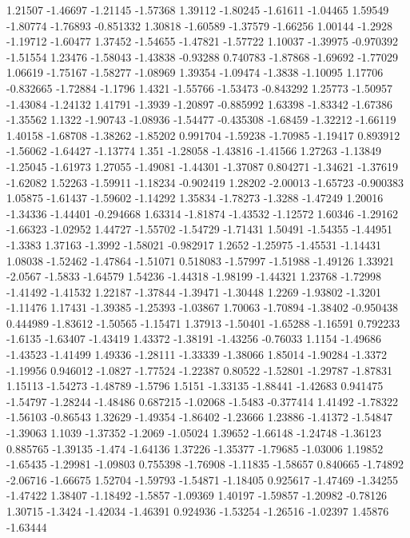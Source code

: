 \documentclass[9pt]{article}
\theoremstyle{plain}
\theoremstyle{definition}
\theoremstyle{remark}
\numberwithin{equation}{section}
\begin{document}
1.21507
-1.46697
-1.21145
-1.57368
1.39112
-1.80245
-1.61611
-1.04465
1.59549
-1.80774
-1.76893
-0.851332
1.30818
-1.60589
-1.37579
-1.66256
1.00144
-1.2928
-1.19712
-1.60477
1.37452
-1.54655
-1.47821
-1.57722
1.10037
-1.39975
-0.970392
-1.51554
1.23476
-1.58043
-1.43838
-0.93288
0.740783
-1.87868
-1.69692
-1.77029
1.06619
-1.75167
-1.58277
-1.08969
1.39354
-1.09474
-1.3838
-1.10095
1.17706
-0.832665
-1.72884
-1.1796
1.4321
-1.55766
-1.53473
-0.843292
1.25773
-1.50957
-1.43084
-1.24132
1.41791
-1.3939
-1.20897
-0.885992
1.63398
-1.83342
-1.67386
-1.35562
1.1322
-1.90743
-1.08936
-1.54477
-0.435308
-1.68459
-1.32212
-1.66119
1.40158
-1.68708
-1.38262
-1.85202
0.991704
-1.59238
-1.70985
-1.19417
0.893912
-1.56062
-1.64427
-1.13774
1.351
-1.28058
-1.43816
-1.41566
1.27263
-1.13849
-1.25045
-1.61973
1.27055
-1.49081
-1.44301
-1.37087
0.804271
-1.34621
-1.37619
-1.62082
1.52263
-1.59911
-1.18234
-0.902419
1.28202
-2.00013
-1.65723
-0.900383
1.05875
-1.61437
-1.59602
-1.14292
1.35834
-1.78273
-1.3288
-1.47249
1.20016
-1.34336
-1.44401
-0.294668
1.63314
-1.81874
-1.43532
-1.12572
1.60346
-1.29162
-1.66323
-1.02952
1.44727
-1.55702
-1.54729
-1.71431
1.50491
-1.54355
-1.44951
-1.3383
1.37163
-1.3992
-1.58021
-0.982917
1.2652
-1.25975
-1.45531
-1.14431
1.08038
-1.52462
-1.47864
-1.51071
0.518083
-1.57997
-1.51988
-1.49126
1.33921
-2.0567
-1.5833
-1.64579
1.54236
-1.44318
-1.98199
-1.44321
1.23768
-1.72998
-1.41492
-1.41532
1.22187
-1.37844
-1.39471
-1.30448
1.2269
-1.93802
-1.3201
-1.11476
1.17431
-1.39385
-1.25393
-1.03867
1.70063
-1.70894
-1.38402
-0.950438
0.444989
-1.83612
-1.50565
-1.15471
1.37913
-1.50401
-1.65288
-1.16591
0.792233
-1.6135
-1.63407
-1.43419
1.43372
-1.38191
-1.43256
-0.76033
1.1154
-1.49686
-1.43523
-1.41499
1.49336
-1.28111
-1.33339
-1.38066
1.85014
-1.90284
-1.3372
-1.19956
0.946012
-1.0827
-1.77524
-1.22387
0.80522
-1.52801
-1.29787
-1.87831
1.15113
-1.54273
-1.48789
-1.5796
1.5151
-1.33135
-1.88441
-1.42683
0.941475
-1.54797
-1.28244
-1.48486
0.687215
-1.02068
-1.5483
-0.377414
1.41492
-1.78322
-1.56103
-0.86543
1.32629
-1.49354
-1.86402
-1.23666
1.23886
-1.41372
-1.54847
-1.39063
1.1039
-1.37352
-1.2069
-1.05024
1.39652
-1.66148
-1.24748
-1.36123
0.885765
-1.39135
-1.474
-1.64136
1.37226
-1.35377
-1.79685
-1.03006
1.19852
-1.65435
-1.29981
-1.09803
0.755398
-1.76908
-1.11835
-1.58657
0.840665
-1.74892
-2.06716
-1.66675
1.52704
-1.59793
-1.54871
-1.18405
0.925617
-1.47469
-1.34255
-1.47422
1.38407
-1.18492
-1.5857
-1.09369
1.40197
-1.59857
-1.20982
-0.78126
1.30715
-1.3424
-1.42034
-1.46391
0.924936
-1.53254
-1.26516
-1.02397
1.45876
-1.63444
\end{document}
